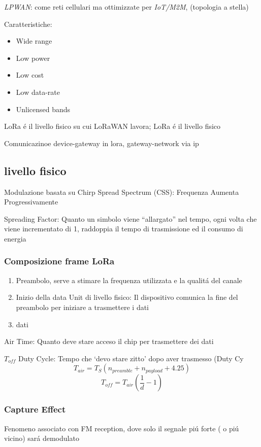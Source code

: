 \documentclass{article}
\begin{document}
\textit{LPWAN}: come reti cellulari ma ottimizzate per \textit{IoT/M2M}, (topologia a stella)

Caratteristiche:
\begin{itemize}
    \item Wide range
    \item Low power
    \item Low cost
    \item Low data-rate
    \item Unlicensed bands
\end{itemize}

LoRa \'e il livello fisico su cui LoRaWAN lavora; LoRa \'e il livello fisico

Comunicazinoe device-gateway in lora, gateway-network via ip

\subsection{livello fisico}
Modulazione basata su Chirp Spread Spectrum (CSS): Frequenza Aumenta Progressivamente

Spreading Factor: Quanto un simbolo viene ``allargato'' nel tempo, ogni volta che viene incrementato di 1, raddoppia il tempo di trasmissione ed il consumo di energia

\subsubsection{Composizione frame LoRa}
\begin{enumerate}
    \item Preambolo, serve a stimare la frequenza utilizzata e la qualit\'a del canale
    \item  Inizio della data Unit di livello fisico: Il dispositivo comunica la fine del preambolo per iniziare a trasmettere i dati
    \item  dati
\end{enumerate}

Air Time: Quanto deve stare acceso il chip per trasmettere dei dati

$T_{off}$ Duty Cycle: Tempo che `devo stare zitto' dopo aver trasmesso (Duty Cy
\[ T_{air} = T_S (n_{preamble} + n_{payload} + 4.25 )\]
\[ T_{off} = T_{air} \left( \frac{1}{d} -1 \right) \]

\subsubsection{Capture Effect}
Fenomeno associato con FM reception, dove solo il segnale pi\'u forte ( o pi\'u vicino) sar\'a demodulato
\end{document}

